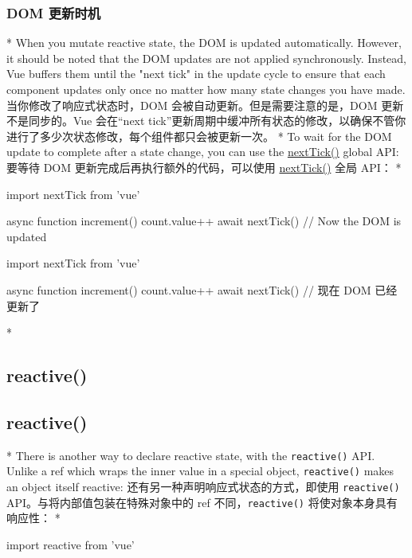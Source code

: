 \begin{paracol}{2}
\subsubsection{DOM 更新时机}
\switchcolumn[0]*%
When you mutate reactive state, the DOM is updated automatically.
However, it should be noted that the DOM updates are not applied
synchronously. Instead, Vue buffers them until the "next tick" in the
update cycle to ensure that each component updates only once no matter
how many state changes you have made.
\switchcolumn
当你修改了响应式状态时，DOM 会被自动更新。但是需要注意的是，DOM
更新不是同步的。Vue 会在``next
tick''更新周期中缓冲所有状态的修改，以确保不管你进行了多少次状态修改，每个组件都只会被更新一次。
\switchcolumn[0]*%
To wait for the DOM update to complete after a state change, you can use
the \href{https://vuejs.org/api/general.html\#nexttick}{nextTick()}
global API:
\switchcolumn
要等待 DOM 更新完成后再执行额外的代码，可以使用
\href{https://cn.vuejs.org/api/general.html\#nexttick}{nextTick()} 全局
API：
\switchcolumn[0]*%
\begin{codeJs}
import { nextTick } from 'vue'

async function increment() {
    count.value++
    await nextTick()
    // Now the DOM is updated
}
\end{codeJs}
\switchcolumn
\begin{codeJs}
import { nextTick } from 'vue'

async function increment() {
    count.value++
    await nextTick()
    // 现在 DOM 已经更新了
}
\end{codeJs}

\switchcolumn[0]*%
\subsection{reactive()}
\switchcolumn
\subsection{reactive()}
\switchcolumn[0]*%
There is another way to declare reactive state, with the
\texttt{reactive()} API. Unlike a ref which wraps the inner value in a
special object, \texttt{reactive()} makes an object itself reactive:
\switchcolumn
还有另一种声明响应式状态的方式，即使用 \texttt{reactive()}
API。与将内部值包装在特殊对象中的 ref 不同，\texttt{reactive()}
将使对象本身具有响应性：
\switchcolumn[0]*%
\begin{codeJs}
import { reactive } from 'vue'


\end{codeJs}
\end{paracol}
